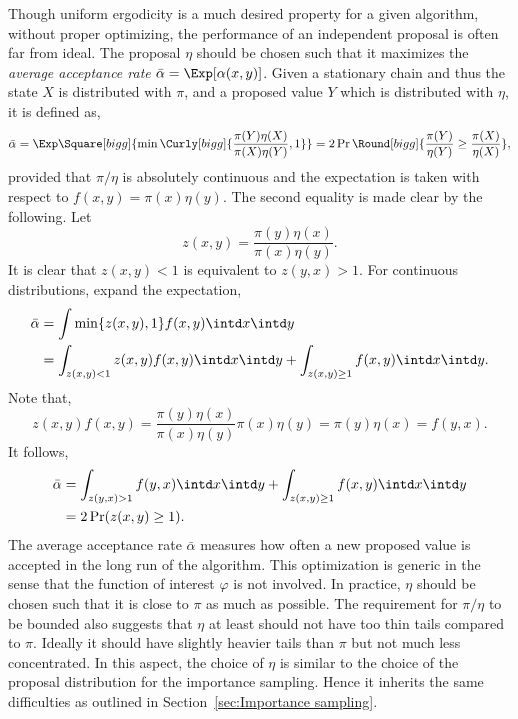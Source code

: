 Though uniform ergodicity is a much desired property for a given algorithm, without proper optimizing, the performance of an independent proposal is often far from ideal. The proposal $\eta$ should be chosen such that it maximizes the \emph{average acceptance rate} $\bar\alpha = \Exp[\alpha(x,y)]$. Given a stationary chain and thus the state $X$ is distributed with $\pi$, and a proposed value $Y$ which is distributed with $\eta$, it is defined as,
\begin{equation}
  \bar\alpha
  = \Exp\Square[bigg]{\min\Curly[bigg]{\frac{\pi(Y)\eta(X)}{\pi(X)\eta(Y)},1}}
  = 2\Pr\Round[bigg]{\frac{\pi(Y)}{\eta(Y)}\ge\frac{\pi(X)}{\eta(X)}},
\end{equation}
provided that $\pi/\eta$ is absolutely continuous and the expectation is taken with respect to $f(x,y) = \pi(x)\eta(y)$. The second equality is made clear by the following. Let
\begin{equation*}
  z(x,y) = \frac{\pi(y)\eta(x)}{\pi(x)\eta(y)}.
\end{equation*}
It is clear that $z(x,y) < 1$ is equivalent to $z(y,x)>1$. For continuous distributions, expand the expectation,
\begin{align*}
  \bar\alpha
  &= \int \min\{z(x,y),1\} f(x,y)\intd x \intd y \\
  &= \int_{z(x,y) < 1} z(x,y)f(x,y) \intd x \intd y
  + \int_{z(x,y)\ge1} f(x,y)\intd x \intd y. \\
\end{align*}
Note that,
\begin{equation*}
  z(x,y)f(x,y)
  = \frac{\pi(y)\eta(x)}{\pi(x)\eta(y)}\pi(x)\eta(y)
  = \pi(y)\eta(x)
  = f(y,x).
\end{equation*}
It follows,
\begin{align*}
  \bar\alpha
  &= \int_{z(y,x) > 1} f(y, x) \intd x \intd y
  + \int_{z(x,y)\ge1} f(x,y) \intd x \intd y\\
  &= 2\Pr(z(x,y)\ge1).
\end{align*}
The average acceptance rate $\bar\alpha$ measures how often a new proposed value is accepted in the long run of the algorithm. This optimization is generic in the sense that the function of interest $\varphi$ is not involved. In practice, $\eta$ should be chosen such that it is close to $\pi$ as much as possible. The requirement for $\pi/\eta$ to be bounded also suggests that $\eta$ at least should not have too thin tails compared to $\pi$. Ideally it should have slightly heavier tails than $\pi$ but not much less concentrated. In this aspect, the choice of $\eta$ is similar to the choice of the proposal distribution for the importance sampling. Hence it inherits the same difficulties as outlined in Section~\ref{sec:Importance sampling}.

